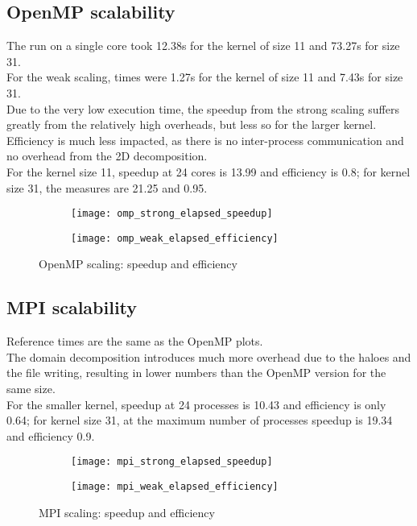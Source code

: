 \documentclass[a4paper, 11pt]{article}
\begin{document}
\subsection{OpenMP scalability}
The run on a single core took 12.38s for the kernel of size 11 and 73.27s for size 31.\\
For the weak scaling, times were 1.27s for the kernel of size 11 and 7.43s for size 31.\\
Due to the very low execution time, the speedup from the strong scaling suffers greatly from the relatively high overheads, but less so for the larger kernel.\\
Efficiency is much less impacted, as there is no inter-process communication and no overhead from the 2D decomposition.\\
For the kernel size 11, speedup at 24 cores is 13.99 and efficiency is 0.8; for kernel size 31, the measures are 21.25 and 0.95.\\
\begin{figure}[h]
\centering
\begin{subfigure}{.5\textwidth}
  \centering
  \texttt{[image: omp\_strong\_elapsed\_speedup]}
  \label{fig:omp_strong_elapsed_speedup}
\end{subfigure}%
\begin{subfigure}{.5\textwidth}
  \centering
  \texttt{[image: omp\_weak\_elapsed\_efficiency]}
  \label{fig:omp_weak_elapsed_efficiency}
\end{subfigure}
\caption{OpenMP scaling: speedup and efficiency}
\label{fig:omp_scaling}
\end{figure}
\FloatBarrier
\subsection{MPI scalability}
Reference times are the same as the OpenMP plots.\\
The domain decomposition introduces much more overhead due to the haloes and the file writing, resulting in lower numbers than the OpenMP version for the same size.\\
For the smaller kernel, speedup at 24 processes is 10.43 and efficiency is only 0.64; for kernel size 31, at the maximum number of processes speedup is 19.34 and efficiency 0.9.\\
\begin{figure}[!h]
\centering
\begin{subfigure}{.5\textwidth}
  \centering
  \texttt{[image: mpi\_strong\_elapsed\_speedup]}
  \label{fig:mpi_strong_elapsed_speedup}
\end{subfigure}%
\begin{subfigure}{.5\textwidth}
  \centering
  \texttt{[image: mpi\_weak\_elapsed\_efficiency]}
  \label{fig:mpi_weak_elapsed_efficiency}
\end{subfigure}
\caption{MPI scaling: speedup and efficiency}
\label{fig:mpi_scaling}
\end{figure}
\FloatBarrier
\end{document}
